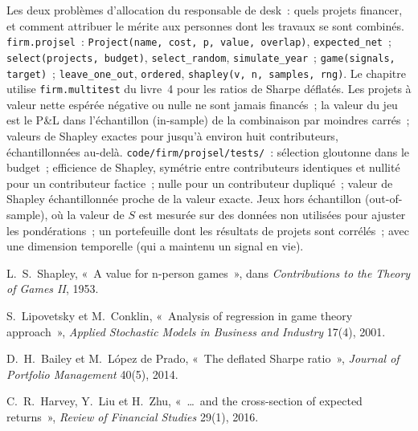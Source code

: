 \begin{build}
 Les deux problèmes d'allocation du responsable de desk~: quels projets financer, et comment attribuer le mérite aux personnes dont les travaux se sont combinés.
 \texttt{firm.projsel}~: \texttt{Project(name, cost, p, value, overlap)}, \texttt{expected\_net}~;
\texttt{select(projects, budget)}, \texttt{select\_random}, \texttt{simulate\_year}~; \texttt{game(signals, target)}~; \texttt{leave\_one\_out}, \texttt{ordered},
\texttt{shapley(v, n, samples, rng)}. Le chapitre utilise \texttt{firm.multitest} du livre~4 pour les ratios de Sharpe déflatés.
 Les projets à valeur nette espérée négative ou nulle ne sont jamais financés~; la valeur du jeu est le P\&L dans l'échantillon (in-sample) de la combinaison par
moindres carrés~; valeurs de Shapley exactes pour jusqu'à environ huit contributeurs, échantillonnées au-delà.
 \texttt{code/firm/projsel/tests/}~: sélection gloutonne dans le budget~; efficience de Shapley, symétrie entre
contributeurs identiques et nullité pour un contributeur factice~;  nulle pour un contributeur dupliqué~; valeur de Shapley échantillonnée proche de la valeur exacte.
 Jeux hors échantillon (out-of-sample), où la valeur de $S$ est mesurée sur des données non utilisées pour ajuster les pondérations~; un portefeuille dont les résultats de projets
sont corrélés~;  avec une dimension temporelle (qui a maintenu un signal en vie).
\end{build}

\begin{omsources}
\item L.~S.~Shapley, «~A value for n-person games~», dans \emph{Contributions to the Theory of Games II}, 1953.
\item S.~Lipovetsky et M.~Conklin, «~Analysis of regression in game theory approach~», \emph{Applied Stochastic Models in Business and Industry}
17(4), 2001.
\item D.~H.~Bailey et M.~López de Prado, «~The deflated Sharpe ratio~», \emph{Journal of Portfolio Management} 40(5), 2014.
\item C.~R.~Harvey, Y.~Liu et H.~Zhu, «~\dots\ and the cross-section of expected returns~», \emph{Review of Financial Studies} 29(1), 2016.
\end{omsources}

